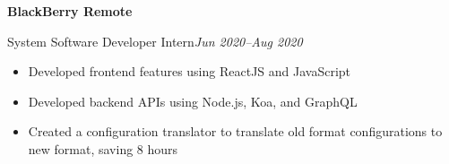 \textbf{BlackBerry \hfill Remote}\par

System Software Developer Intern\hfill \textit{Jun 2020--Aug 2020}
\begin{itemize}
        \item Developed frontend features using ReactJS and JavaScript
        \item Developed backend APIs using Node.js, Koa, and GraphQL
        \item Created a configuration translator to translate old format configurations to new format, saving 8 hours
\end{itemize}

